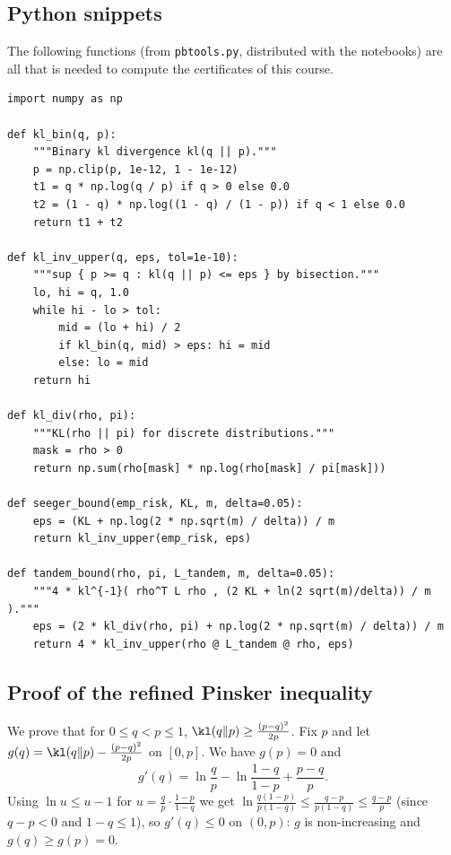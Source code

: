 \subsection{Python snippets}

The following functions (from \texttt{pbtools.py}, distributed with the
notebooks) are all that is needed to compute the certificates of this course.

\begin{tcolorbox}[colback=black!3,colframe=black!30,boxrule=0.4pt,sharp corners]
\small
\begin{verbatim}
import numpy as np

def kl_bin(q, p):
    """Binary kl divergence kl(q || p)."""
    p = np.clip(p, 1e-12, 1 - 1e-12)
    t1 = q * np.log(q / p) if q > 0 else 0.0
    t2 = (1 - q) * np.log((1 - q) / (1 - p)) if q < 1 else 0.0
    return t1 + t2

def kl_inv_upper(q, eps, tol=1e-10):
    """sup { p >= q : kl(q || p) <= eps } by bisection."""
    lo, hi = q, 1.0
    while hi - lo > tol:
        mid = (lo + hi) / 2
        if kl_bin(q, mid) > eps: hi = mid
        else: lo = mid
    return hi

def kl_div(rho, pi):
    """KL(rho || pi) for discrete distributions."""
    mask = rho > 0
    return np.sum(rho[mask] * np.log(rho[mask] / pi[mask]))

def seeger_bound(emp_risk, KL, m, delta=0.05):
    eps = (KL + np.log(2 * np.sqrt(m) / delta)) / m
    return kl_inv_upper(emp_risk, eps)

def tandem_bound(rho, pi, L_tandem, m, delta=0.05):
    """4 * kl^{-1}( rho^T L rho , (2 KL + ln(2 sqrt(m)/delta)) / m )."""
    eps = (2 * kl_div(rho, pi) + np.log(2 * np.sqrt(m) / delta)) / m
    return 4 * kl_inv_upper(rho @ L_tandem @ rho, eps)
\end{verbatim}
\end{tcolorbox}

\subsection{Proof of the refined Pinsker inequality}

We prove that for $0\leq q<p\leq 1$, $\kl(q\|p)\geq\frac{(p-q)^2}{2p}$.
Fix $p$ and let $g(q)=\kl(q\|p)-\frac{(p-q)^2}{2p}$ on $[0,p]$. We have
$g(p)=0$ and
\[
g'(q)=\ln\frac{q}{p}-\ln\frac{1-q}{1-p}+\frac{p-q}{p}.
\]
Using $\ln u\leq u-1$ for $u=\frac{q}{p}\cdot\frac{1-p}{1-q}$ we get
$\ln\frac{q(1-p)}{p(1-q)}\leq\frac{q-p}{p(1-q)}\leq\frac{q-p}{p}$
(since $q-p<0$ and $1-q\leq1$), so $g'(q)\leq0$ on $(0,p)$: $g$ is
non-increasing and $g(q)\geq g(p)=0$.

